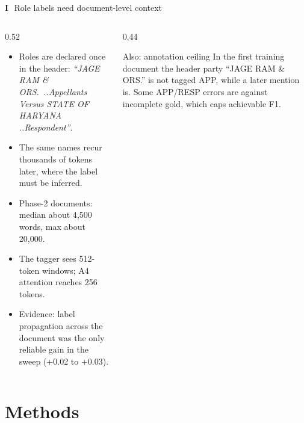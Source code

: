 \documentclass[aspectratio=169,11pt]{beamer}
\newcommand{\pb}[1]{\textbf{\textcolor{warm}{#1}}}   %
\begin{document}
\begin{frame}{\pb{I}\,\, Role labels need document-level context}
  \begin{columns}[T]
    \begin{column}{0.52\textwidth}
      \footnotesize
      \begin{itemize}
        \item Roles are declared once in the header: \textit{``JAGE RAM \& ORS.\ ..Appellants Versus STATE OF HARYANA ..Respondent''}.
        \item The same names recur thousands of tokens later, where the label must be inferred.
        \item Phase-2 documents: median about 4{,}500 words, max about 20{,}000.
        \item The tagger sees 512-token windows; A4 attention reaches 256 tokens.
        \item Evidence: label propagation across the document was the only reliable gain in the sweep (+0.02 to +0.03).
      \end{itemize}
    \end{column}
    \begin{column}{0.44\textwidth}
      \begin{alertblock}{Also: annotation ceiling}
        \footnotesize
        In the first training document the header party ``JAGE RAM \& ORS.'' is not tagged APP, while a later mention is. Some APP/RESP errors are against incomplete gold, which caps achievable F1.
      \end{alertblock}
    \end{column}
  \end{columns}
\end{frame}

\section{Methods}
\end{document}
